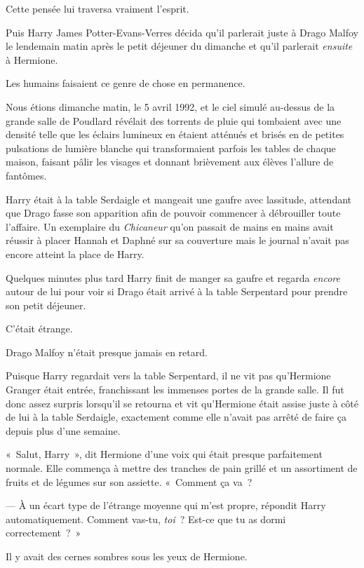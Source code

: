 Cette pensée lui traversa vraiment l'esprit.

Puis Harry James Potter-Evans-Verres décida qu'il parlerait juste à Drago Malfoy le lendemain matin après le petit déjeuner du dimanche et qu'il parlerait \emph{ensuite} à Hermione.

Les humains faisaient ce genre de chose en permanence.

\later

Nous étions dimanche matin, le 5 avril 1992, et le ciel simulé au-dessus de la grande salle de Poudlard révélait des torrents de pluie qui tombaient avec une densité telle que les éclairs lumineux en étaient atténués et brisés en de petites pulsations de lumière blanche qui transformaient parfois les tables de chaque maison, faisant pâlir les visages et donnant brièvement aux élèves l'allure de fantômes.

Harry était à la table Serdaigle et mangeait une gaufre avec lassitude, attendant que Drago fasse son apparition afin de pouvoir commencer à débrouiller toute l'affaire.
Un exemplaire du \emph{Chicaneur} qu'on passait de mains en mains avait réussir à placer Hannah et Daphné sur sa couverture mais le journal n'avait pas encore atteint la place de Harry.

Quelques minutes plus tard Harry finit de manger sa gaufre et regarda \emph{encore} autour de lui pour voir si Drago était arrivé à la table Serpentard pour prendre son petit déjeuner.

C'était étrange.

Drago Malfoy n'était presque jamais en retard.

Puisque Harry regardait vers la table Serpentard, il ne vit pas qu'Hermione Granger était entrée, franchissant les immenses portes de la grande salle.
Il fut donc assez surpris lorsqu'il se retourna et vit qu'Hermione était assise juste à côté de lui à la table Serdaigle, exactement comme elle n'avait pas arrêté de faire ça depuis plus d'une semaine.

«~Salut, Harry~», dit Hermione d'une voix qui était presque parfaitement normale.
Elle commença à mettre des tranches de pain grillé et un assortiment de fruits et de légumes sur son assiette.
«~Comment ça va~?

--- À un écart type de l'étrange moyenne qui m'est propre, répondit Harry automatiquement.
Comment vas-tu, \emph{toi}~?
Est-ce que tu as dormi correctement~?~»

Il y avait des cernes sombres sous les yeux de Hermione.

